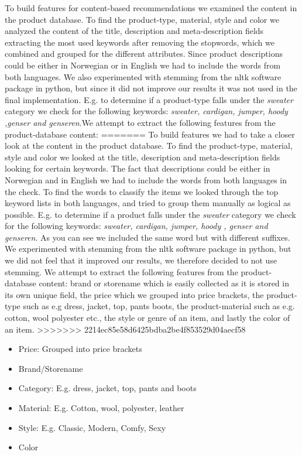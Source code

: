 To build features for content-based recommendations we examined the content in the product database. To find the product-type, material, style and color we analyzed the content of the title, description and meta-description fields extracting the most used keywords after removing the stopwords, which we combined and grouped for the different attributes. Since product descriptions could be either in Norwegian or in English we had to include the words from both languages. We also experimented with stemming from the nltk software package in python, but since it did not improve our results it was not used in the final implementation. E.g. to determine if a product-type falls under the \emph{sweater} category we check for the following keywords: \emph{sweater, cardigan, jumper, hoody ,genser and genseren}.We attempt to extract the following features from the product-database content:
=======
To build features we had to take a closer look at the content in the product database. To find the product-type, material, style and color we looked at the title, description and meta-description fields looking for certain keywords. The fact that descriptions could be either in Norwegian and in English we had to include the words from both languages in the check. To find the words to classify the items we looked through the top keyword lists in both languages, and tried to group them manually as logical as possible. E.g. to determine if a product falls under the \emph{sweater} category we check for the following keywords: \emph{sweater, cardigan, jumper, hoody , genser and genseren}. As you can see we included the same word but with different suffixes. We experimented with stemming from the nltk software package in python, but we did not feel that it improved
our results, we therefore decided to not use stemming. We attempt to extract the following features from the product-database content: brand or storename which is easily collected as it is stored in its own unique field, the price which we grouped into price brackets, the product-type such as e.g dress, jacket, top, pants boots, the product-material such as e.g. cotton, wool polyester etc., the style or genre of an item, and lastly the color of an item.
>>>>>>> 2214ec85e58d6425bdba2be4f853529d04aecf58

\begin{itemize}
\item Price: Grouped into price brackets
\item Brand/Storename
\item Category: E.g. dress, jacket, top, pants and boots
\item Material: E.g. Cotton, wool, polyester, leather
\item Style: E.g. Classic, Modern, Comfy, Sexy
\item Color
\end{itemize}

